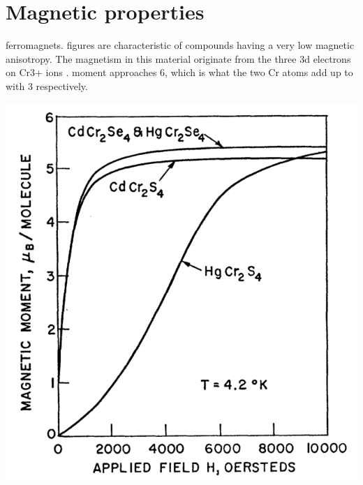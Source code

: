 \documentclass[preprint,pre,floats,aps,amsmath,amssymb]{revtex4}
\begin{document}

\section{Magnetic properties}

ferromagnets. figures are characteristic of compounds having a very low magnetic anisotropy. The magnetism in this material originate from the three 3d electrons on Cr3+ ions \cite{selmi}. moment approaches 6, which is what the two Cr atoms add up to with 3 respectively.

\noindent\begin{minipage}{0.39\linewidth}
\includegraphics[width=1\linewidth]{momvsfield.png}
\centering{}
\end{minipage}%
~ ~
\end{document}
